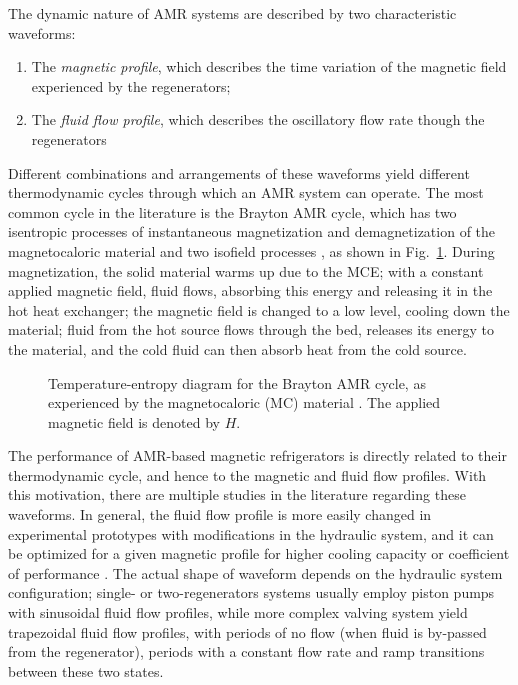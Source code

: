 \documentclass[draft]{svjour3}
\begin{document}
The dynamic nature of AMR systems are described by two characteristic waveforms:

\begin{enumerate}
\item The \emph{magnetic profile}, which describes the time variation of the magnetic field experienced by the regenerators;
\item The \emph{fluid flow profile}, which describes the oscillatory flow rate though the regenerators
\end{enumerate}

Different combinations and arrangements of these waveforms yield different thermodynamic cycles through which an AMR system can operate. The most common cycle in the literature is the Brayton AMR cycle, which has two isentropic processes of instantaneous magnetization and demagnetization of the magnetocaloric material and two isofield processes \cite{bib:kitanovski}, as shown in Fig.~\ref{fig:brayton}. During magnetization, the solid material warms up due to the MCE; with a constant applied magnetic field, fluid flows, absorbing this energy and releasing it in the hot heat exchanger; the magnetic field is changed to a low level, cooling down the material; fluid from the hot source flows through the bed, releases its energy to the material, and the cold fluid can then absorb heat from the cold source. 

\begin{figure}[!ht]
  \centering
  \caption{Temperature-entropy diagram for the Brayton AMR cycle, as experienced by the magnetocaloric (MC)  material \cite{bib:kitanovski}. The applied magnetic field is denoted by $H$.}
  \label{fig:brayton}
\end{figure}

The performance of AMR-based magnetic refrigerators is directly related to their thermodynamic cycle, and hence to the magnetic and fluid flow profiles. With this motivation, there are multiple studies in the literature regarding these waveforms. In general, the fluid flow profile is more easily changed in experimental prototypes with modifications in the hydraulic system, and it can be optimized for a given magnetic profile for higher cooling capacity or coefficient of performance \cite{bib:teyber17_exper,bib:nakashima18-influen-exp,FORTKAMP2018}. The actual shape of waveform depends on the hydraulic system configuration; single- or two-regenerators systems usually employ piston pumps with sinusoidal fluid flow profiles, while more complex valving system yield trapezoidal fluid flow profiles, with periods of no flow (when fluid is by-passed from the regenerator), periods with a constant flow rate and ramp transitions between these two states.
\end{document}
